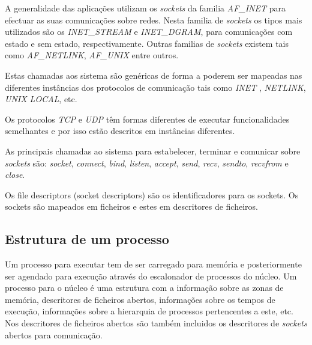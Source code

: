 

 A generalidade das aplicações utilizam os \textit{sockets} da familia \textit{AF\_INET} para efectuar as suas comunicações sobre redes.
 Nesta familia de \textit{sockets} os tipos mais utilizados são os \textit{INET\_STREAM} e \textit{INET\_DGRAM}, para comunicações com estado e sem estado, respectivamente.
 Outras familias de \textit{sockets} existem tais como \textit{AF\_NETLINK}, \textit{AF\_UNIX} entre outros. 

Estas chamadas aos sistema são genéricas de forma a poderem ser mapeadas nas diferentes instâncias dos protocolos de comunicação tais como \textit{INET} , \textit{NETLINK}, \textit{UNIX LOCAL}, etc.

Os protocolos \textit{TCP} e \textit{UDP} têm formas diferentes de executar funcionalidades semelhantes e por isso estão descritos em instâncias diferentes.


As principais chamadas ao sistema para estabelecer, terminar e comunicar sobre \textit{sockets} são: \textit{socket}, \textit{connect}, \textit{bind}, \textit{listen}, \textit{accept}, \textit{send}, \textit{recv}, \textit{sendto}, \textit{recvfrom} e \textit{close}. 

Os file descriptors (socket descriptors) são os identificadores para os sockets. Os sockets são mapeados em ficheiros e estes em descritores de ficheiros. 

\subsection{Estrutura de um processo}

Um processo para executar tem de ser carregado para memória e posteriormente ser agendado para execução através do escalonador de processos do núcleo.
 Um processo para o núcleo é uma estrutura com a informação sobre as zonas de memória, descritores de ficheiros abertos, informações sobre os tempos de execução, informações sobre a hierarquia de processos pertencentes a este, etc.
 Nos descritores de ficheiros abertos são também incluidos os descritores de \textit{sockets} abertos para comunicação. 

